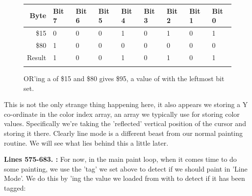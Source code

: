 \begin{figure}[H]
  {
    \setlength{\tabcolsep}{3.0pt}
    \setlength\cmidrulewidth{\heavyrulewidth} %
    \begin{adjustbox}{width=7cm,center}

      \begin{tabular}{rllllllll}
        \toprule
        Byte & Bit 7 & Bit 6 & Bit 5 & Bit 4 & Bit 3 & Bit 2 & Bit 1 & Bit 0        \\
        \midrule
        \$15 & 0 & 0 & 0 & 1 & 0 & 1 & 0 & 1 \\
        \$80 & 1 & 0 & 0 & 0 & 0 & 0 & 0 & 0 \\
        \midrule
      Result & 1 & 0 & 0 & 1 & 0 & 1 & 0 & 1 \\
        \addlinespace
        \bottomrule
      \end{tabular}

    \end{adjustbox}

  }\caption*{OR'ing a  of \$15 and \$80 gives \$95, a value of  with the leftmost bit set.}
\end{figure}

This is not the only strange thing happening here, it also 
appears we storing a Y co-ordinate in the color index array, an array we typically use for
storing color values. Specifically we're taking the 'reflected' vertical position of the 
cursor and storing it there. Clearly line mode is a different beast from our normal painting routine. We will
see what lies behind this a little later.


\textbf{Lines 575-683. :} For now, in the main paint loop, when it comes time to do some
painting, we use the 'tag' we set above to detect if we should paint in 'Line Mode'. We do this by 'ing the
value we loaded from  with  to detect if it has been tagged:

